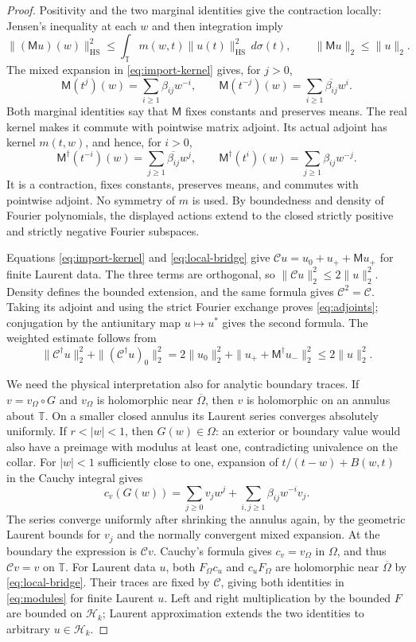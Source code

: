 \documentclass[11pt]{article}
\newcommand{\T}{\mathbb T}
\newcommand{\cC}{\mathcal C}
\newcommand{\cH}{\mathcal H}
\newcommand{\M}{\mathsf M}
\newcommand{\HS}{\mathrm{HS}}
\theoremstyle{definition}
\theoremstyle{remark}
\numberwithin{equation}{section}
\begin{document}
\begin{proof}
Positivity and the two marginal identities give the contraction locally:
Jensen's inequality at each $w$ and then integration imply
\[
 \|(\M u)(w)\|_{\HS}^2
 \le\int_\T m(w,t)\|u(t)\|_{\HS}^2\,d\sigma(t),
 \qquad \|\M u\|_2\le\|u\|_2.
\]
The mixed expansion in \eqref{eq:import-kernel} gives, for $j>0$,
\[
 \M(t^j)(w)=\sum_{i\ge1}\beta_{ij}w^{-i},\qquad
 \M(t^{-j})(w)=\sum_{i\ge1}\overline{\beta_{ij}}w^i.
\]
Both marginal identities say that $\M$ fixes constants and preserves
means. The real kernel makes it commute with pointwise matrix adjoint.
Its actual adjoint has kernel $m(t,w)$, and hence, for $i>0$,
\[
 \M^\dagger(t^{-i})(w)=\sum_{j\ge1}\overline{\beta_{ij}}w^j,
 \qquad
 \M^\dagger(t^i)(w)=\sum_{j\ge1}\beta_{ij}w^{-j}.
\]
It is a contraction, fixes constants, preserves means, and commutes with
pointwise adjoint. No symmetry of $m$ is used.
By boundedness and density of Fourier polynomials, the displayed actions
extend to the closed strictly positive and strictly negative Fourier subspaces.

Equations \eqref{eq:import-kernel} and \eqref{eq:local-bridge} give
$\cC u=u_0+u_++\M u_+$ for finite Laurent data. The three terms
are orthogonal, so $\|\cC u\|_2^2\le2\|u\|_2^2$. Density
defines the bounded extension, and the same formula gives $\cC^2=\cC$.
Taking its adjoint and using the strict Fourier exchange proves
\eqref{eq:adjoints}; conjugation by the antiunitary map $u\mapsto u^*$
gives the second formula. The weighted estimate follows from
\[
 \|\cC^\dagger u\|_2^2+\|(\cC^\dagger u)_0\|_2^2
 =2\|u_0\|_2^2+\|u_++\M^\dagger u_-\|_2^2
 \le2\|u\|_2^2.
\]

We need the physical interpretation also for analytic boundary traces.
If $v=v_\Omega\circ G$ and $v_\Omega$ is holomorphic near
$\overline\Omega$, then $v$ is holomorphic on an annulus about $\T$.
On a smaller closed annulus its Laurent series converges absolutely
uniformly. If $r<|w|<1$, then $G(w)\in\Omega$: an exterior or
boundary value would also have a preimage with modulus at least one,
contradicting univalence on the collar. For $|w|<1$ sufficiently close
to one, expansion of
$t/(t-w)+B(w,t)$ in the Cauchy integral gives
\[
 c_v(G(w))=\sum_{j\ge0}v_jw^j+
             \sum_{i,j\ge1}\beta_{ij}w^{-i}v_j.
\]
The series converge uniformly after shrinking the annulus again, by
the geometric Laurent bounds for $v_j$ and the normally convergent
mixed expansion. At the boundary the expression is $\cC v$.
Cauchy's formula gives $c_v=v_\Omega$ in $\Omega$, and thus
$\cC v=v$ on $\T$. For Laurent data $u$, both $F_\Omega c_u$ and
$c_uF_\Omega$ are holomorphic near $\overline\Omega$ by
\eqref{eq:local-bridge}. Their traces are fixed by $\cC$, giving both
identities in \eqref{eq:modules} for finite Laurent $u$. Left and right
multiplication by the bounded $F$ are bounded on $\cH_k$; Laurent
approximation extends the two identities to arbitrary $u\in\cH_k$.


\end{proof}
\end{document}
